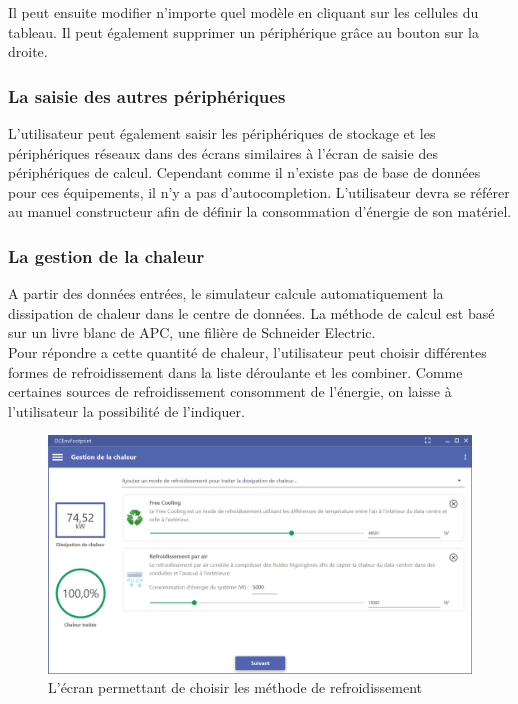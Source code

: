 Il peut ensuite modifier n'importe quel modèle en cliquant sur les cellules du tableau. Il peut également supprimer un périphérique grâce au bouton sur la droite.

\subsubsection{La saisie des autres périphériques}
L'utilisateur peut également saisir les périphériques de stockage et les périphériques réseaux dans des écrans similaires à l'écran de saisie des périphériques de calcul. Cependant comme il n'existe pas de base de données pour ces équipements, il n'y a pas d'autocompletion. L'utilisateur devra se référer au manuel constructeur afin de définir la consommation d'énergie de son matériel.

\subsubsection{La gestion de la chaleur}
A partir des données entrées, le simulateur calcule automatiquement la dissipation de chaleur dans le centre de données. La méthode de calcul est basé sur un livre blanc de APC, une filière de Schneider Electric.\\
Pour répondre a cette quantité de chaleur, l'utilisateur peut choisir différentes formes de refroidissement dans la liste déroulante et les combiner. Comme certaines sources de refroidissement consomment de l'énergie, on laisse à l'utilisateur la possibilité de l'indiquer.

\begin{figure}[h!]
	\begin{center}
		\includegraphics[scale=0.5]{partie3/images/chaleur.png}
		\caption{L'écran permettant de choisir les méthode de refroidissement}
	\end{center}
\end{figure}

